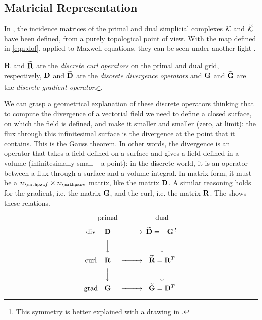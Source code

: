 \subsection{Matricial Representation}

In , the incidence matrices of the primal
and dual simplicial complexes $\mathcal{K}$ and $\widetilde{\mathcal{K}}$ have been
defined, from a purely topological point of view. With the map defined
in \eqref{eqn:dof}, applied to Maxwell equations, they can be seen
under another light \cite{trevisan_geometric}.

$\mathbf{R}$ and $\widetilde{\mathbf{R}}$ are the
\emph{discrete curl operators} on the primal and dual grid,
respectively, $\mathbf{D}$ and $\widetilde{\mathbf{D}}$ are the
\emph{discrete divergence operators} and $\mathbf{G}$ and
$\widetilde{\mathbf{G}}$ are the \emph{discrete gradient
operators}\footnote{This symmetry is better explained with a drawing
  in .}.

We can grasp a geometrical explanation of these discrete operators
thinking that to compute the divergence of a vectorial field we need to
define a closed surface, on which the field is defined, and make it
smaller and smaller (zero, at limit): the flux through this
infinitesimal surface is the divergence at the point that it
contains. This is the Gauss theorem. In other words, the divergence
is an operator that takes a field defined on a surface and gives a
field defined in a volume (infinitesimally small -- a point): in the
discrete world, it is an operator between a flux through a surface and
a volume integral. In matrix form, it must be a $\CrossProd{\nf}{\nv}$
matrix, like the matrix $\mathbf{D}$. A similar
reasoning holds for the gradient, i.e. the matrix $\mathbf{G}$, and the curl,
i.e. the matrix $\mathbf{R}$. The 
shows these relations.

\begin{equation} \label{dia:discrete_operators}
  \begin{CD}
    @. \text{primal} @. \text{dual} \\
    \text{div}  @. \Matrix{D} @>>> \Dual{\Matrix{D}} = -\Transpose{\Matrix{G}} \\
    @.             @VVV            @VVV \\
    \text{curl} @. \Matrix{R} @>>> \Dual{\Matrix{R}} = \Transpose{\Matrix{R}} \\
    @.             @VVV            @VVV \\
    \text{grad} @. \Matrix{G} @>>> \Dual{\Matrix{G}} = \Transpose{\Matrix{D}}
  \end{CD}
\end{equation}

